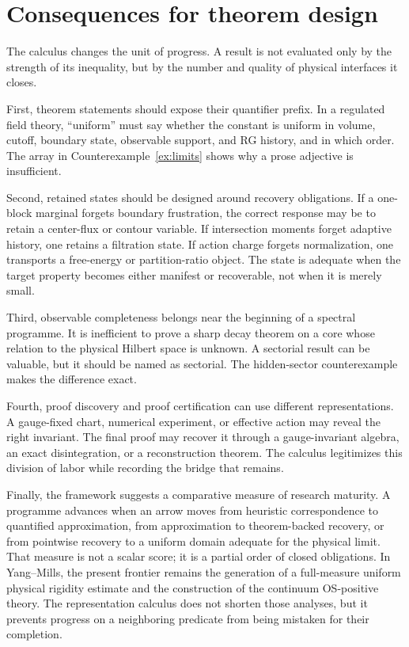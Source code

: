 \section{Consequences for theorem design}
\label{sec:discussion}

The calculus changes the unit of progress.  A result is not evaluated only by
the strength of its inequality, but by the number and quality of physical
interfaces it closes.

First, theorem statements should expose their quantifier prefix.  In a
regulated field theory, ``uniform'' must say whether the constant is uniform
in volume, cutoff, boundary state, observable support, and RG history, and in
which order.  The array in Counterexample~\ref{ex:limits} shows why a prose
adjective is insufficient.

Second, retained states should be designed around recovery obligations.  If a
one-block marginal forgets boundary frustration, the correct response may be
to retain a center-flux or contour variable.  If intersection moments forget
adaptive history, one retains a filtration state.  If action charge forgets
normalization, one transports a free-energy or partition-ratio object.  The
state is adequate when the target property becomes either manifest or
recoverable, not when it is merely small.

Third, observable completeness belongs near the beginning of a spectral
programme.  It is inefficient to prove a sharp decay theorem on a core whose
relation to the physical Hilbert space is unknown.  A sectorial result can be
valuable, but it should be named as sectorial.  The hidden-sector
counterexample makes the difference exact.

Fourth, proof discovery and proof certification can use different
representations.  A gauge-fixed chart, numerical experiment, or effective
action may reveal the right invariant.  The final proof may recover it through
a gauge-invariant algebra, an exact disintegration, or a reconstruction
theorem.  The calculus legitimizes this division of labor while recording the
bridge that remains.

Finally, the framework suggests a comparative measure of research maturity.
A programme advances when an arrow moves from heuristic correspondence to
quantified approximation, from approximation to theorem-backed recovery, or
from pointwise recovery to a uniform domain adequate for the physical limit.
That measure is not a scalar score; it is a partial order of closed
obligations.  In Yang--Mills, the present frontier remains the generation of a
full-measure uniform physical rigidity estimate and the construction of the
continuum OS-positive theory.  The representation calculus does not shorten
those analyses, but it prevents progress on a neighboring predicate from
being mistaken for their completion.
